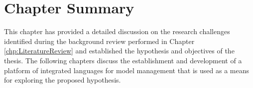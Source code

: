 \section{Chapter Summary}

This chapter has provided a detailed discussion on the research challenges identified during the background review performed in Chapter \ref{chp:LiteratureReview} and established the hypothesis and objectives of the thesis. The following chapters discuss the establishment and development of a platform of integrated languages for model management that is used as a means for exploring the proposed hypothesis.